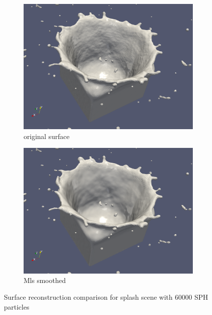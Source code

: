 \begin{figure}
	\begin{center}
		\begin{subfigure}[b]{\textwidth}
			\includegraphics[width=\textwidth]{figures/MLSCrownZB.png}
			\caption{original surface}
			\label{fig:crown_zb}
		\end{subfigure}
		\begin{subfigure}[b]{\textwidth}
			\includegraphics[width=\textwidth]{figures/MLSCrownZBMLS.png}
			\caption{Mls smoothed}
			\label{fig:crown_zb_mls}
		\end{subfigure}
	\end{center}
	\caption{Surface reconstruction comparison for splash scene with 60000 SPH particles} \label{fig:crown_zb_mls}
\end{figure}
        
